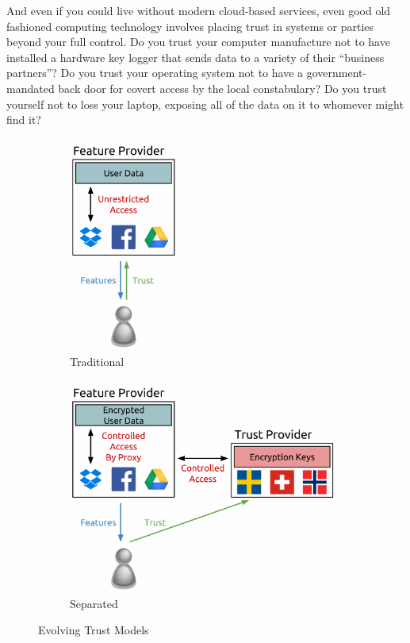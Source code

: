 And even if you could live without modern cloud-based services, even
good old fashioned computing technology involves placing trust in
systems or parties beyond your full control. Do you trust your
computer manufacture not to have installed a hardware key logger that
sends data to a variety of their ``business partners''? Do you trust
your operating system not to have a government-mandated back door for
covert access by the local constabulary?  Do you trust yourself not to
loss your laptop, exposing all of the data on it to whomever might
find it?

\begin{figure}[!tb]
  \vspace{5ex}
  \begin{center}
    \begin{subfigure}{.32\textwidth}
      \begin{center}
        \includegraphics[height=200pt]{./figs/pdf/TrustModel-Traditional.pdf}
        \caption{Traditional}
        \label{fig:trust-traditional}
      \end{center}
    \end{subfigure}
    \begin{subfigure}{.65\textwidth}
      \begin{center}
        \includegraphics[height=200pt]{./figs/pdf/TrustModel-Seperated.pdf}
        \caption{Separated}
        \label{fig:trust-seperated}
      \end{center}
    \end{subfigure}
  \end{center}
  \caption{Evolving Trust Models}
  \label{fig:trust}
\end{figure}

